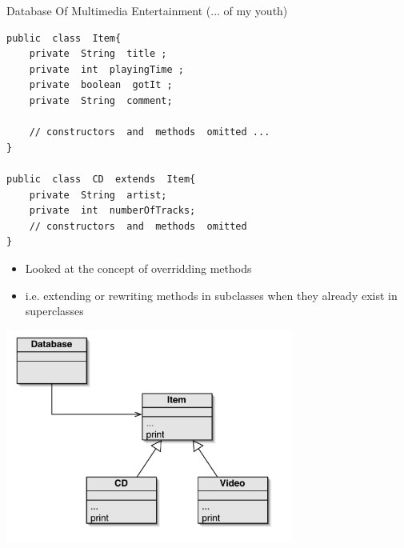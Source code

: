 \documentclass{beamer}
\begin{document}
\begin{frame}[fragile]
\begin{center}
\item Database Of Multimedia Entertainment (... of my youth)
\end{center}
\begin{block}{}
\begin{lstlisting}
public  class  Item{
    private  String  title ;
    private  int  playingTime ;
    private  boolean  gotIt ;
    private  String  comment;
    
    // constructors  and  methods  omitted ...
}

public  class  CD  extends  Item{
    private  String  artist;
    private  int  numberOfTracks;
    // constructors  and  methods  omitted
}
\end{lstlisting}
\end{block}
\end{frame}

\begin{frame}
\begin{itemize}
\item Looked at the concept of overridding methods 
\item i.e. extending or rewriting methods in subclasses when they already exist in superclasses
\end{itemize}
\end{frame}

\begin{frame}
\begin{center}
\includegraphics[height=7cm, keepaspectratio]{images/poly3}
\end{center}
\end{frame}
\end{document}
